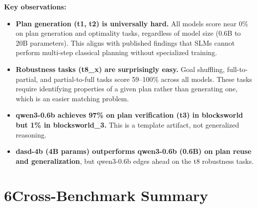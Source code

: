 \documentclass[11pt,letterpaper]{article}
\begin{document}
\vspace{0.3cm}
\textbf{Key observations:}
\begin{itemize}
  \item \textbf{Plan generation (t1, t2) is universally hard.} All models score near 0\% on plan generation and optimality tasks, regardless of model size (0.6B to 20B parameters). This aligns with published findings that SLMs cannot perform multi-step classical planning without specialized training.
  \item \textbf{Robustness tasks (t8\_x) are surprisingly easy.} Goal shuffling, full-to-partial, and partial-to-full tasks score 59--100\% across all models. These tasks require identifying properties of a given plan rather than generating one, which is an easier matching problem.
  \item \textbf{qwen3-0.6b achieves 97\% on plan verification (t3) in blocksworld but 1\% in blocksworld\_3.} This is a template artifact, not generalized reasoning.
  \item \textbf{dasd-4b (4B params) outperforms qwen3-0.6b (0.6B) on plan reuse and generalization}, but qwen3-0.6b edges ahead on the t8 robustness tasks.
\end{itemize}

\newpage

\section*{6\quad Cross-Benchmark Summary}
\end{document}
